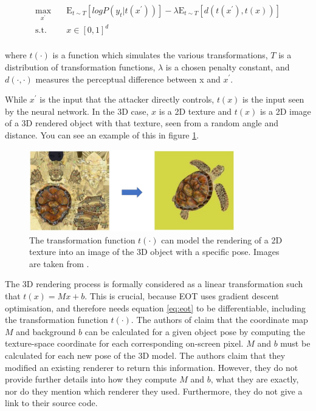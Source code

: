 \begin{equation}
\label{eq:eot}
\begin{aligned}
\max_{x^\prime} \quad & \mathrm{E}_{t\sim T}[log P(y_{t} | t(x^\prime))] - \lambda \mathrm{E}_{t\sim T}[d(t(x^\prime), t(x))]\\
\textrm{s.t.} \quad & x \in [0, 1]^d   \\
\end{aligned}
\end{equation}

\noindent where $t(\cdot)$ is a function which simulates the various transformations, $T$ is a distribution of transformation functions, $\lambda$ is a chosen penalty constant, and $d(\cdot, \cdot)$ measures the perceptual difference between x and $x^\prime$.

While $x^\prime$ is the input that the attacker directly controls, $t(x)$ is the input seen by the neural network. In the 3D case, $x$ is a 2D texture and $t(x)$ is a 2D image of a 3D rendered object with that texture, seen from a random angle and distance. You can see an example of this in figure \ref{fig:rendering}. 

\begin{figure}[h]
    \centering
    \includegraphics[width=0.8\textwidth]{graphics/rendering.JPG}
    \caption{The transformation function $t(\cdot)$ can model the rendering of a 2D texture into an image of the 3D object with a specific pose. Images are taken from \cite{athalye}.}
    \label{fig:rendering}
\end{figure}

The 3D rendering process is formally considered as a linear transformation such that $t(x) = Mx + b$. This is crucial, because EOT uses gradient descent optimisation, and therefore needs equation \ref{eq:eot} to be differentiable, including the transformation function $t(\cdot)$. The authors of \cite{athalye} claim that the coordinate map $M$ and background $b$ can be calculated for a given object pose by computing the texture-space coordinate for each corresponding on-screen pixel. $M$ and $b$ must be calculated for each new pose of the 3D model. The authors claim that they modified an existing renderer to return this information. However, they do not provide further details into how they compute $M$ and $b$, what they are exactly, nor do they mention which renderer they used. Furthermore, they do not give a link to their source code.

